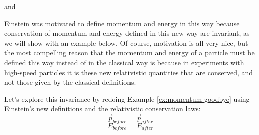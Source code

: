 
and


Einstein was motivated to define momentum and energy in this way
because conservation of momentum and energy defined in this
new way are invariant, as we will show with an example below.  Of
course, motivation is all very nice, but the most compelling reason
that the momentum and energy of a particle must be defined this way
instead of in the classical way is because in experiments with high-speed
particles it is these new relativistic quantities that are conserved,
and not those given by the classical definitions.

Let's explore this invariance by redoing Example \ref{ex:momentum-goodbye} 
using Einstein's new definitions and the relativistic conservation laws:
\begin{equation}
\vec{p}_{ before} = \vec{p}_{ after}
\end{equation}
\begin{equation}
E_{ before} = E_{ after}
\label{eq:econs}
\end{equation}


